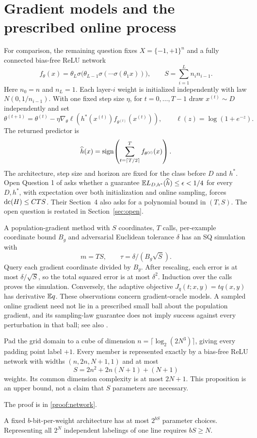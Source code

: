 \section{Gradient models and the prescribed online process}\label{app:sgdmodels}
For comparison, the remaining question fixes $X=\{-1,+1\}^n$ and a fully connected bias-free ReLU network
\[
 f_\theta(x)=\theta_L\sigma\bigl(\theta_{L-1}\sigma(\cdots\sigma(\theta_1x))\bigr),
 \qquad S=\sum_{i=1}^L n_i n_{i-1}.
\]
Here $n_0=n$ and $n_L=1$. Each layer-$i$ weight is initialized independently with law $N(0,1/n_{i-1})$. With one fixed step size $\eta$, for $t=0,\ldots,T-1$ draw $x^{(t)}\sim D$ independently and set
\[
 \theta^{(t+1)}=\theta^{(t)}-\eta\nabla_\theta
 \ell\!\left(h^*(x^{(t)})f_{\theta^{(t)}}(x^{(t)})\right),
 \qquad \ell(z)=\log(1+e^{-z}).
\]
The returned predictor is
\[
 \widehat h(x)=\operatorname{sign}\!\left(\sum_{t=\lceil T/2\rceil}^{T}f_{\theta^{(t)}}(x)\right).
\]
The architecture, step size and horizon are fixed for the class before $D$ and $h^*$. Open Question 1 of \citet[Section~2]{FKS26} asks whether a guarantee $\mathbb E L_{D,h^*}(\widehat h)\le\epsilon<1/4$ for every $D,h^*$, with expectation over both initialization and online sampling, forces $\operatorname{dc}(H)\le CTS$. Their Section~4 also asks for a polynomial bound in $(T,S)$. The open question is restated in Section~\ref{sec:open}.

A population-gradient method with $S$ coordinates, $T$ calls, per-example coordinate bound $B_g$ and adversarial Euclidean tolerance $\delta$ has an SQ simulation with
\[
 m=TS,\qquad\tau=\delta/(B_g\sqrt S).
\]
Query each gradient coordinate divided by $B_g$. After rescaling, each error is at most $\delta/\sqrt S$, so the total squared error is at most $\delta^2$. Induction over the calls proves the simulation. Conversely, the adaptive objective $J_q(t;x,y)=tq(x,y)$ has derivative $\mathbb E q$. These observations concern gradient-oracle models. A sampled online gradient need not lie in a prescribed small ball about the population gradient, and its sampling-law guarantee does not imply success against every perturbation in that ball; see also \citet{FGV21,AKMSS21}.

\begin{proposition}\label{thm:network}
Pad the grid domain to a cube of dimension $n=\lceil\log_2(2N^3)\rceil$, giving every padding point label $+1$. Every member is represented exactly by a bias-free ReLU network with widths $(n,2n,N+1,1)$ and at most
\[
 S=2n^2+2n(N+1)+(N+1)
\]
weights. Its common dimension complexity is at most $2N+1$. This proposition is an upper bound, not a claim that $S$ parameters are necessary.
\end{proposition}
\noindent The proof is in \cref{proof:network}.

A fixed $b$-bit-per-weight architecture has at most $2^{bS}$ parameter choices. Representing all $2^N$ independent labelings of one line requires $bS\ge N$.
